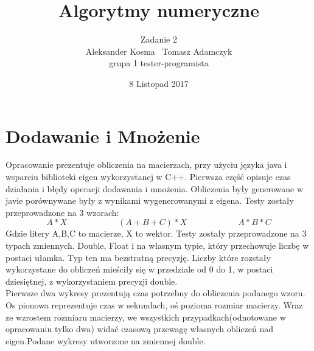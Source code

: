 \documentclass[8pt]{article}
\title{Algorytmy numeryczne}
\author{Zadanie 2 \\ Aleksander Kosma \ Tomasz Adamczyk\\grupa 1 tester-programista}
\date{8 Listopad 2017}
\begin{document}
\maketitle 

\section{Dodawanie i Mnożenie}

Opracowanie prezentuje obliczenia na macierzach, przy użyciu języka java i wsparciu biblioteki eigen 
wykorzystanej w C++.
Pierwsza część opisuje czas działania i błędy operacji dodawania i mnożenia.
Obliczenia były generowane w javie porównywane były z wynikami wygenerowanymi z eigena.
Testy zostały przeprowadzone na 3 wzorach:
$$A * X\qquad \qquad \qquad  (A+B+C)*X \qquad \qquad \qquad A*B*C$$
Gdzie litery A,B,C to macierze, X to wektor.
Testy zostały przeprowadzone na 3 typach zmiennych. Double, Float i na własnym typie, który przechowuje
liczbę w postaci ułamka. Typ ten ma bezstratną precyzję. Liczby które rozstały wykorzystane do obliczeń mieściły się w przedziale od 0 do 1, w postaci dziesiętnej, z wykorzystaniem precyzji double.\\

Pierwsze dwa wykresy prezentują czas potrzebny do obliczenia podanego wzoru. Os pionowa reprezentuje czas w sekundach, oś pozioma rozmiar macierzy. Wraz ze wzrostem rozmiaru macierzy, we wszystkich przypadkach(odnotowane w opracowaniu tylko dwa) widać czasową przewagę własnych obliczeń nad eigen.Podane wykresy utworzone na zmiennej double.\\
\begin{center}
\end{center}
\end{document}
